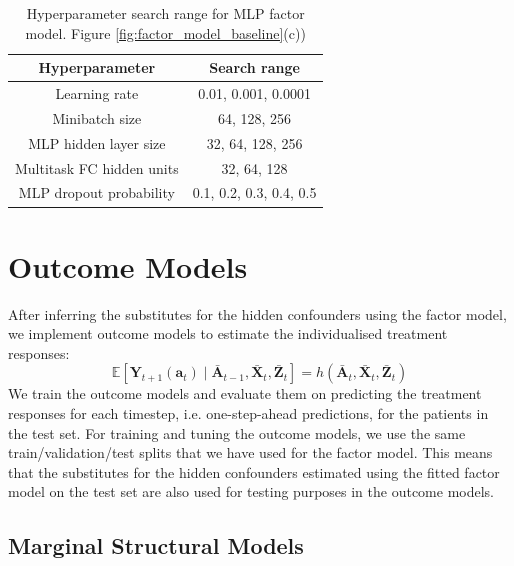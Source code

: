 \documentclass{article}
\newcommand{\vc}[1]{\mathbf{#1}}
\newcommand{\hist}[1]{\bar{\vc{#1}}}
\begin{document}
	\begin{table}[ht]
		\caption{Hyperparameter search range for MLP factor model. Figure \ref{fig:factor_model_baseline}(c))}
		\label{tab:hyperparameters_mlp}
		\vskip 0.15in
		\begin{center}
			\begin{small}
				\begin{tabular}{cc}
					\toprule
					Hyperparameter & Search range \\
					\hline
					\hline
					Learning rate &    0.01, 0.001, 0.0001    \\
					Minibatch size &  64, 128, 256  \\
					MLP hidden layer size &  32, 64, 128, 256  \\
					Multitask FC hidden units & 32, 64, 128\\
					MLP dropout probability &  0.1, 0.2, 0.3, 0.4, 0.5 \\
					\bottomrule
				\end{tabular}
			\end{small}
		\end{center}
		\vskip -0.1in
	\end{table}
	
	
	\section{Outcome Models}
	
	After inferring the substitutes for the hidden confounders using the factor model, we implement outcome models to estimate the individualised treatment responses:
	\begin{equation}
	\mathbb{E} [\vc{Y}_{t+1}(\vc{a}_t) \mid \hist{A}_{t-1}, \hist{X}_t, \hist{Z}_t] = h(\hist{A}_t, \hist{X}_t, \hist{Z}_t)
	\end{equation}
	We train the outcome models and evaluate them on predicting the treatment responses for each timestep, i.e. one-step-ahead predictions, for the patients in the test set. For training and tuning the outcome models, we use the same train/validation/test splits that we have used for the factor model. This means that the substitutes for the hidden confounders estimated using the fitted factor model on the test set are also used for testing purposes in the outcome models.
	
	\subsection{Marginal Structural Models} \label{apx:marginal_structural_models}
	
\end{document}
